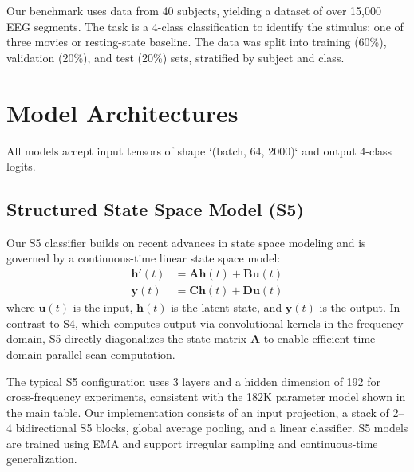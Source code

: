 \documentclass{article}
\begin{document}
Our benchmark uses data from 40 subjects, yielding a dataset of over 15,000 EEG segments. %
The task is a 4-class classification to identify the stimulus: one of three movies or resting-state baseline.
The data was split into training (60\%), validation (20\%), and test (20\%) sets, stratified by subject and class.

\section{Model Architectures}
\label{sec:models}

All models accept input tensors of shape `(batch, 64, 2000)` and output 4-class logits.

\subsection{Structured State Space Model (S5)}
Our S5 classifier builds on recent advances in state space modeling and is governed by a continuous-time linear state space model:
\begin{align}
\mathbf{h}'(t) &= \mathbf{A} \mathbf{h}(t) + \mathbf{B} \mathbf{u}(t) \\
\mathbf{y}(t) &= \mathbf{C} \mathbf{h}(t) + \mathbf{D} \mathbf{u}(t)
\end{align}
where $\mathbf{u}(t)$ is the input, $\mathbf{h}(t)$ is the latent state, and $\mathbf{y}(t)$ is the output. In contrast to S4, which computes output via convolutional kernels in the frequency domain, S5 directly diagonalizes the state matrix $\mathbf{A}$ to enable efficient time-domain parallel scan computation.

The typical S5 configuration uses 3 layers and a hidden dimension of 192 for cross-frequency experiments, consistent with the 182K parameter model shown in the main table.
Our implementation consists of an input projection, a stack of 2--4 bidirectional S5 blocks, global average pooling, and a linear classifier. S5 models are trained using EMA and support irregular sampling and continuous-time generalization.

\end{document}
